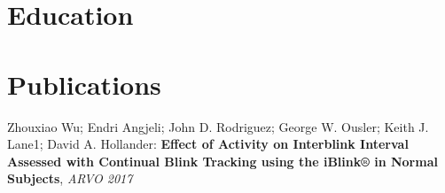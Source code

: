 \documentclass[10pt,a4paper,merriweather]{moderncv}        %
\begin{document}
\section{Education}

\section{Publications}
\small Zhouxiao Wu; Endri Angjeli; John D. Rodriguez; George W. Ousler; Keith J. Lane1; David A. Hollander: \textbf{Effect of Activity on Interblink Interval Assessed with Continual Blink Tracking using the iBlink® in Normal Subjects}, \textit{ARVO 2017}

\clearpage





\end{document}

